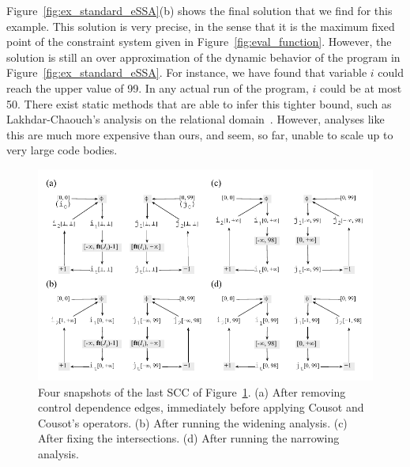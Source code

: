 \documentclass{llncs}
\begin{document}
Figure~\ref{fig:ex_standard_eSSA}(b) shows the final solution that we find
for this example.
This solution is very precise, in the sense that it is the maximum fixed
point of the constraint system given in Figure~\ref{fig:eval_function}.
However, the solution is still an over approximation of the dynamic behavior of
the program in Figure~\ref{fig:ex_standard_eSSA}.
For instance, we have found that variable $i$ could reach the upper value of
99.
In any actual run of the program, $i$ could be at most 50.
There exist static methods that are able to infer this tighter bound, such as
Lakhdar-Chaouch's analysis on the relational domain~\cite{Lakhdar11}.
However, analyses like this are much more expensive than ours, and seem, so
far, unable to scale up to very large code bodies. 

\begin{figure}[t!]
\begin{center}
\includegraphics[width=\textwidth]{images/ex_partition_grow_crop}
\end{center}
\caption{\label{fig:ex_partition_grow_crop}
Four snapshots of the last SCC of Figure~\ref{fig:ex_partition_grow_crop}.
(a) After removing control dependence edges, immediately before applying
Cousot and Cousot's operators.
(b) After running the widening analysis.
(c) After fixing the intersections.
(d) After running the narrowing analysis.}
\end{figure}
\end{document}
